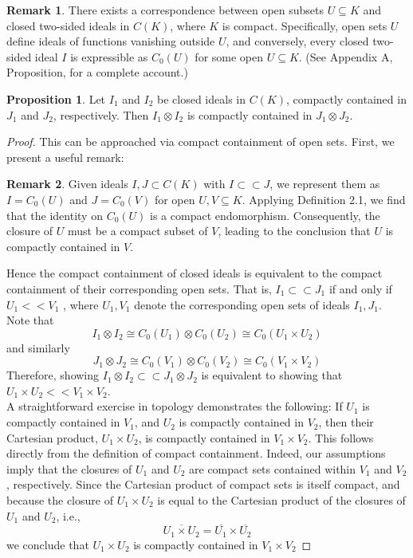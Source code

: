 \documentclass{iopconfser}
\theoremstyle{definition}
\newtheorem{proposition}{Proposition}[section]
\newtheorem{remark}{Remark}[section]
\begin{document}
\begin{remark}
There exists a correspondence between open subsets $U \subseteq K$ and closed two-sided ideals in $C(K)$, where $K$ is compact. Specifically, open sets $U$ define ideals of functions vanishing outside $U$, and conversely, every closed two-sided ideal $I$ is expressible as $C_0(U)$ for some open $U \subseteq K$. (See Appendix A, Proposition, for a complete account.)
\end{remark}
\begin{proposition}
Let $I_1$ and $I_2$ be closed ideals in $C(K)$, compactly contained in $J_1$ and $J_2$, respectively. Then $I_1 \otimes I_2$ is compactly contained in $J_1 \otimes J_2$. 
\end{proposition}
\begin{proof}
    

This can be approached via compact containment of open sets. First, we present a useful remark:\\
\begin{remark}
  Given ideals $I,J \subset C(K)$ with $I \subset \subset J$, we represent them as $I=C_0(U)$ and $J=C_0(V)$ for open $U,V \subseteq K$. Applying Definition 2.1, we find that the identity on $C_0(U)$ is a compact endomorphism. Consequently, the closure of $U$ must be a compact subset of $V$, leading to the conclusion that $U$ is compactly contained in $V$.  
\end{remark}

 Hence the compact containment of closed ideals is equivalent to the compact containment of their corresponding open sets.  That is, $I_1 \subset \subset J_1 $
  if and only if $U_1 << V_1$
 , where $U_1, V_1$ denote the corresponding open sets of ideals $I_1, J_1$. Note that $$I_1 \otimes I_2 \cong C_0(U_1) \otimes C_0(U_2) \cong C_0(U_1 \times U_2)$$
 and similarly 
 $$J_1 \otimes J_2 \cong C_0(V_1) \otimes C_0(V_2) \cong C_0(V_1 \times V_2)$$
 Therefore, showing $I_1 \otimes I_2 \subset \subset J_1 \otimes J_2$ 
 is equivalent to showing that $U_1 \times U_2 << V_1 \times V_2$.\\ 

 A straightforward exercise in topology demonstrates the following: If $U_1$ is compactly contained in $V_1$, and $U_2$ is compactly contained in $V_2$, then their Cartesian product, $U_1 \times U_2$, is compactly contained in $V_1 \times V_2$. This follows directly from the definition of compact containment.  Indeed, our assumptions imply that the closures of $U_1$ and $U_2$ are compact sets contained within $V_1$ and $V_2$, respectively.  Since the Cartesian product of compact sets is itself compact, and because the closure of $U_1 \times U_2$ is equal to the Cartesian product of the closures of $U_1$ and $U_2$, i.e.,  
 $$\overline{U_1 \times U_2}=\overline{U_1} \times \overline{U_2}$$ we conclude that $U_1 \times U_2$ is compactly contained in $V_1 \times V_2$ 
\end{proof}
 
\end{document}
